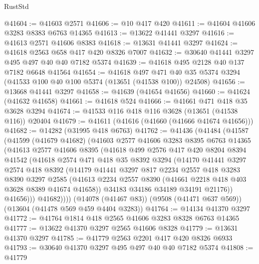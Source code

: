 \begin{lexlean}{RustStd}
\begin{coremodule}
@41604 := @41603 @2571
@41606 := @10 @417 @420
@41611 := @41604 @41606 @3283 @8383 @6763 @14365
@41613 := @13622 @41441 @3297
@41616 := @41613 @2571 @41606 @8383
@41618 := @13631 @41441 @3297
@41624 := @41618 @2563 @658 @417 @420 @8326 @7007
@41632 := @30640 @41441 @3297 @495 @497 @40 @40 @7182 @5374
@41639 := @41618 @495 @2128 @40 @137 @7182 @6648 @41564
@41654 := @41618
    @497
    @471
    @40
    @35
    @5374
    @3294
    (@41533 @100 @40 @100 @5374 (@13651 (@41538 @100)) @24508)
@41656 := @13668 @41441 @3297
@41658 := @41639 (@41654 @41656)
@41660 := @41624 (@41632 @41658)
@41661 := @41618 @524
@41666 := @41661 @471 @418 @35 @3628 @3294
@41674 := @41533 @116 @418 @116 @3628 (@13651 (@41538 @116)) @20404
@41679 := @41611 (@41616 (@41660 (@41666 @41674 @41656)))
@41682 := @14282 (@31995 @418 @6763)
@41762 := @41436
    (@41484
      (@41587
        (@41599
          (@41679 @41682)
          (@41603
            @2577
            @41606
            @3283
            @8395
            @6763
            @14365
            (@41613
              @2577
              @41606
              @8395
              (@41618
                @499
                @2576
                @417
                @420
                @8204
                @8394
                @41542
                (@41618
                  @2574
                  @471
                  @418
                  @35
                  @8392
                  @3294
                  (@14170
                    @41441
                    @3297
                    @2574
                    @418
                    @8392
                    (@14179
                      @41441
                      @3297
                      @817
                      @2234
                      @2557
                      @418
                      @3283
                      @8390
                      @3297
                      @2585
                      (@41613 @2234 @2557 @8390 (@41661 @2218 @418 @403 @3628 @8389 @41674 @41658))
                      @34183
                      @34186
                      @34189
                      @34191
                      @21176))
                  @41656)))
            @41682))))
    (@14078 (@41467 @83))
    (@9508 (@41471 @637 @569))
    (@13604 (@41478 @569 @459 @4404 @3283))
@41764 := @14134 @41370 @3297
@41772 := @41764 @1814 @418 @2565 @41606 @3283 @8328 @6763 @14365
@41777 := @13622 @41370 @3297 @2565 @41606 @8328
@41779 := @13631 @41370 @3297
@41785 := @41779 @2563 @2201 @417 @420 @8326 @6933
@41793 := @30640 @41370 @3297 @495 @497 @40 @40 @7182 @5374
@41808 := @41779

\end{coremodule}
\end{lexlean}
